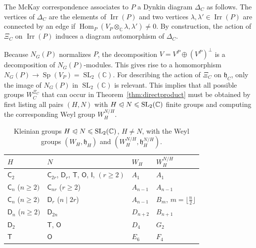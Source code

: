 \documentclass[10pt,a4paper]{amsart}
\DeclareMathOperator{\Hom}{Hom}
\DeclareMathOperator{\Irr}{Irr}
\DeclareMathOperator{\SL}{SL}
\DeclareMathOperator{\Sp}{Sp}
\newcommand{\CC}{\mathbb C}
\begin{document}
The McKay correspondence associates to \(P\) a Dynkin diagram \(\Delta_C\) as follows.
The vertices of \(\Delta_C\) are the elements of \(\Irr(P)\) and two vertices \(\lambda,\lambda'\in \Irr(P)\) are connected by an edge if \(\Hom_P(V_P\otimes_\CC \lambda, \lambda') \neq 0\).
By construction, the action of \(\Xi_C\) on \(\Irr(P)\) induces a diagram automorphism of \(\Delta_C\).

Because \(N_G(P)\) normalizes \(P\), the decomposition \(V = V^P \oplus (V^P)^\perp\) is a decomposition of \(N_G(P)\)-modules. This gives rise to a homomorphism $N_G(P) \to \Sp(V_P) = \SL_2(\CC)$.
For describing the action of \(\Xi_C\) on \(\mathfrak h_C\), only the image of \(N_G(P)\) in \(\SL_2(\CC)\) is relevant. This implies that all possible groups \(W_C^{\Xi_C}\) that can occur in Theorem~\ref{thm:directproduct} must be obtained by first listing all pairs \((H, N)\) with \(H \trianglelefteqslant N \leqslant \SL_2(\CC)\) finite groups and computing the corresponding Weyl group \(W_{H}^{N/H}\).

\begin{table}[h]
  \caption{Kleinian groups \(H\trianglelefteqslant N\leqslant\SL_2(\CC)\), \(H\neq N\), with the Weyl groups \((W_H, \mathfrak h_H)\) and \((W_H^{N/H}, \mathfrak h_H^{N/H})\).}
  \label{tab:kleinianpairs}
  \begin{tabular}{l|l|l|l}
  \(H\)                         & \(N\)       & \(W_H\) & \(W_H^{N/H}\)             \\
  \hline
  \(\mathsf C_2\)               & \(\mathsf C_{2r}\), \(\mathsf D_r\), \(\mathsf T\), \(\mathsf O\), \(\mathsf I\), \((r\geqslant 2)\) & \(A_1\)         & \(A_1\)                                     \\
  \(\mathsf C_n\) (\(n\geqslant 2)\) & \(\mathsf C_{nr}\) (\(r\geqslant 2\))                                                                & \(A_{n - 1}\)   & \(A_{n - 1}\)                               \\
  \(\mathsf C_n\) (\(n\geqslant 2)\) & \(\mathsf D_{r}\) (\(n \mid 2r\))                                                                & \(A_{n - 1}\)   & \(B_m\), \(m = \lfloor \frac{n}{2}\rfloor\) \\
  \(\mathsf D_n\) (\(n\geqslant 2)\) & \(\mathsf D_{2n}\)                                                                              & \(D_{n + 2}\)   & \(B_{n + 1}\)                               \\
  \(\mathsf D_2\)               & \(\mathsf T\), \(\mathsf O\)                                                                    & \(D_4\)         & \(G_2\)                                     \\
  \(\mathsf T\)                 & \(\mathsf O\)                                                                                   & \(E_6\)         & \(F_4\)
  \end{tabular}
\end{table}
\end{document}

